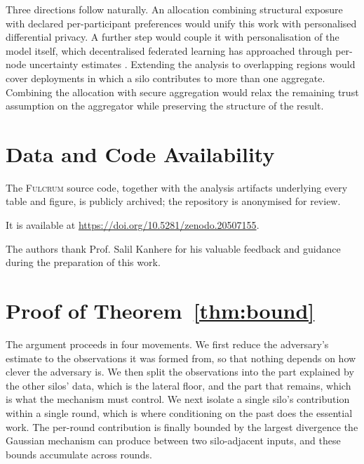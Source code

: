 \documentclass[acmsmall,screen,review,anonymous]{acmart}
\theoremstyle{acmdefinition}%
\newcommand{\Fulcrum}{\textsc{Fulcrum}\xspace}
\begin{document}
Three directions follow naturally. An allocation combining structural exposure
with declared per-participant preferences would unify this work with personalised
differential privacy. A further step would couple it with personalisation of the
model itself, which decentralised federated learning has approached through
per-node uncertainty estimates \cite{rangwala2026evidential}. Extending the analysis to overlapping regions would cover
deployments in which a silo contributes to more than one aggregate. Combining the
allocation with secure aggregation would relax the remaining trust assumption on
the aggregator while preserving the structure of the result.

\section*{Data and Code Availability}

The \Fulcrum source code, together with the analysis artifacts underlying every
table and figure, is publicly archived; the repository is anonymised for review.
\begin{anonsuppress}
It is available at \url{https://doi.org/10.5281/zenodo.20507155}.
\end{anonsuppress}

\begin{acks}
The authors thank Prof. Salil Kanhere for his valuable feedback and guidance
during the preparation of this work.
\end{acks}




\appendix

\section{Proof of Theorem~\ref{thm:bound}}
\label{app:bound}

The argument proceeds in four movements. We first reduce the adversary's estimate
to the observations it was formed from, so that nothing depends on how clever the
adversary is. We then split the observations into the part explained by the other
silos' data, which is the lateral floor, and the part that remains, which is what
the mechanism must control. We next isolate a single silo's contribution within a
single round, which is where conditioning on the past does the essential work. The
per-round contribution is finally bounded by the largest divergence the Gaussian
mechanism can produce between two silo-adjacent inputs, and these bounds
accumulate across rounds.
\end{document}
